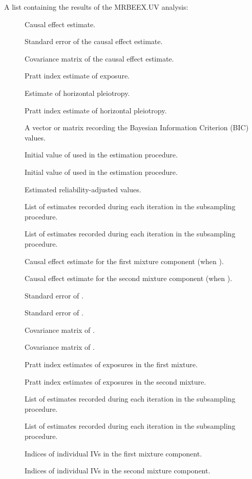 \documentclass[a4paper]{book}
\begin{document}
\begin{Value}
A list containing the results of the MRBEEX.UV analysis:
\begin{description}

\item[] Causal effect estimate.
\item[] Standard error of the causal effect estimate.
\item[] Covariance matrix of the causal effect estimate.
\item[] Pratt index estimate of exposure.
\item[] Estimate of horizontal pleiotropy.
\item[] Pratt index estimate of horizontal pleiotropy.
\item[] A vector or matrix recording the Bayesian Information Criterion (BIC) values.
\item[] Initial value of  used in the estimation procedure.
\item[] Initial value of  used in the estimation procedure.
\item[] Estimated reliability-adjusted values.
\item[] List of  estimates recorded during each iteration in the subsampling procedure.
\item[] List of  estimates recorded during each iteration in the subsampling procedure.
\item[] Causal effect estimate for the first mixture component (when ).
\item[] Causal effect estimate for the second mixture component (when ).
\item[] Standard error of .
\item[] Standard error of .
\item[] Covariance matrix of .
\item[] Covariance matrix of .
\item[] Pratt index estimates of exposures in the first mixture.
\item[] Pratt index estimates of exposures in the second mixture.
\item[] List of  estimates recorded during each iteration in the subsampling procedure.
\item[] List of  estimates recorded during each iteration in the subsampling procedure.
\item[] Indices of individual IVs in the first mixture component.
\item[] Indices of individual IVs in the second mixture component.

\end{description}

\end{Value}
\end{document}
